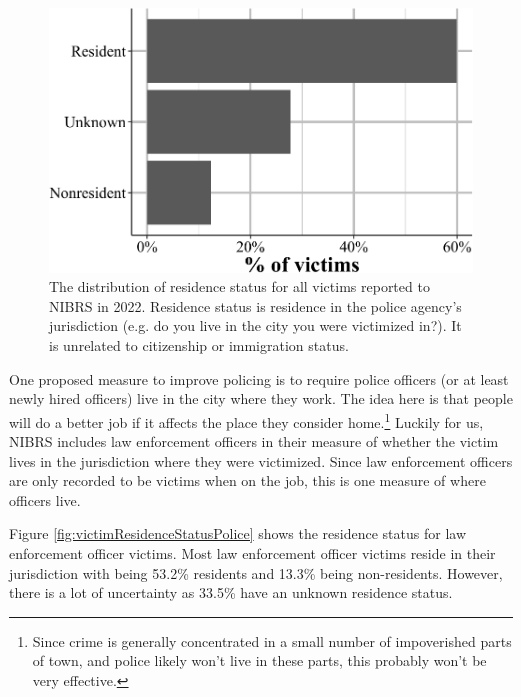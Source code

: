 \documentclass[
  12pt,
  openany]{book}
\begin{document}
\begin{figure}

{\centering \includegraphics[width=0.9\linewidth]{15_nibrs_victim_files/figure-latex/victimResidenceStatus-1} 

}

\caption{The distribution of residence status for all victims reported to NIBRS in 2022. Residence status is residence in the police agency's jurisdiction (e.g. do you live in the city you were victimized in?). It is unrelated to citizenship or immigration status.}\label{fig:victimResidenceStatus}
\end{figure}

One proposed measure to improve policing is to require police officers (or at least newly hired officers) live in the city where they work. The idea here is that people will do a better job if it affects the place they consider home.\footnote{Since crime is generally concentrated in a small number of impoverished parts of town, and police likely won't live in these parts, this probably won't be very effective.} Luckily for us, NIBRS includes law enforcement officers in their measure of whether the victim lives in the jurisdiction where they were victimized. Since law enforcement officers are only recorded to be victims when on the job, this is one measure of where officers live.

Figure \ref{fig:victimResidenceStatusPolice} shows the residence status for law enforcement officer victims. Most law enforcement officer victims reside in their jurisdiction with being 53.2\% residents and 13.3\% being non-residents. However, there is a lot of uncertainty as 33.5\% have an unknown residence status.
\end{document}
